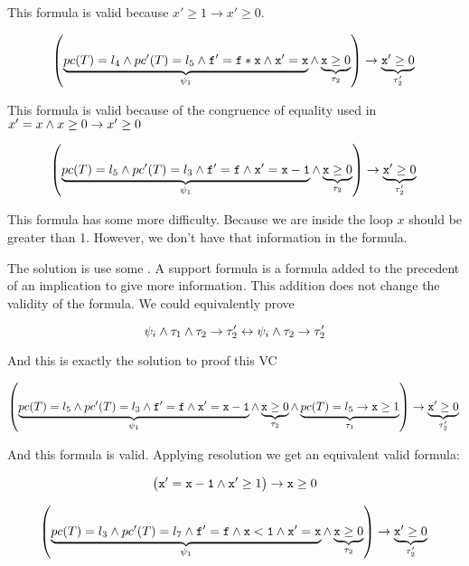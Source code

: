 \begin{example}
	This formula is valid because $x'\geq 1 \to x'\geq 0$.

	\[
		\left(
			\underbrace{pc(T) = l_4 \wedge pc'(T) = l_5 \wedge \mathtt{f}' = \mathtt{f*x} \wedge \mathtt{x'=x}}_{\psi_1} \wedge \underbrace{\mathtt{x} \geq 0}_{\tau_2}
		\right) 
			\to \underbrace{\mathtt{x}' \geq 0}_{\tau_2'}\\\\
	\]

	This formula is valid because of the congruence of equality used in  $x'=x \wedge x\geq 0 \to x'\geq 0$ 

	\[
		\left(
			\underbrace{pc(T) = l_5 \wedge pc'(T) = l_3 \wedge \mathtt{f'=f} \wedge \mathtt{x'=x-1}}_{\psi_1} \wedge \underbrace{\mathtt{x} \geq 0}_{\tau_2}
		\right) 
			\to \underbrace{\mathtt{x}' \geq 0}_{\tau_2'}\\\\
	\]

	This formula has some more difficulty. 
	Because we are inside the loop $x$ should be greater than 1.
	However, we don't have that information in the formula.
	
	The solution is use some .
	A support formula is a formula added to the precedent of an implication to give more information. 
	This addition does not change the validity of the formula.
	We could equivalently prove

	\[
		\psi_i \wedge \tau_1 \wedge \tau_2 \to \tau_2' \leftrightarrow \psi_i\wedge \tau_2\to\tau_2'
	\]

	And this is exactly the solution to proof this \gls{VC}

	\[
		\left(
			\underbrace{pc(T) = l_5 \wedge pc'(T) = l_3 \wedge \mathtt{f'=f} \wedge \mathtt{x'=x-1}}_{\psi_1} \wedge \underbrace{\mathtt{x} \geq 0}_{\tau_2} \wedge \underbrace{pc(T) = l_5 \to \mathtt{x} \geq 1}_{\tau_1}
		\right) 
			\to \underbrace{\mathtt{x}' \geq 0}_{\tau_2'}\\\\
	\]

	And this formula is valid. Applying resolution we get an equivalent valid formula:

	\[
		\left( \mathtt{x'=x-1} \wedge \mathtt{x'}\geq 1\right) \to \mathtt{x} \geq 0
	\]



	\[
		\left(
			\underbrace{pc(T) = l_3 \wedge pc'(T) = l_7 \wedge \mathtt{f'=f} \wedge \mathtt{x<1} \wedge \mathtt{x'=x} }_{\psi_1} \wedge \underbrace{\mathtt{x} \geq 0}_{\tau_2}
		\right) 
			\to \underbrace{\mathtt{x}' \geq 0}_{\tau_2'}\\\\
	\]


\end{example}
